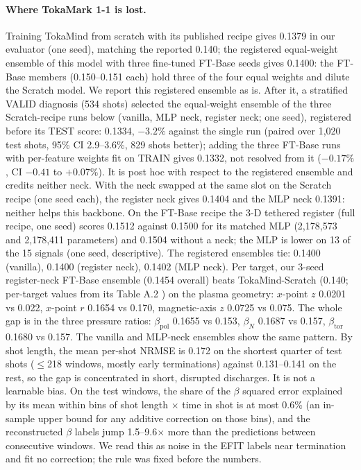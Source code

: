 \documentclass{article}
\begin{document}
\paragraph{Where TokaMark 1-1 is lost.} Training TokaMind from scratch with its published recipe gives 0.1379 in our
evaluator (one seed), matching the reported 0.140; the registered equal-weight ensemble of this model with three
fine-tuned FT-Base seeds gives 0.1400: the FT-Base members (0.150--0.151 each) hold three of the four equal weights and dilute
the Scratch model. We report this registered ensemble as is. After it, a stratified VALID diagnosis (534 shots) selected
the equal-weight ensemble of the three Scratch-recipe runs below (vanilla, MLP neck, register neck; one seed), registered
before its TEST score: 0.1334, $-3.2\%$ against the single run (paired over 1{,}020 test shots, 95\% CI 2.9--3.6\%,
829 shots better); adding the three FT-Base runs with per-feature weights fit on TRAIN gives 0.1332, not resolved from it ($-0.17\%$, CI $-0.41$ to $+0.07\%$). It is post hoc with respect to the registered ensemble and credits neither neck. With the neck swapped
at the same slot on the Scratch recipe (one seed each), the register neck gives 0.1404 and the MLP neck 0.1391: neither
helps this backbone. On the FT-Base recipe the 3-D tethered register (full recipe, one seed) scores 0.1512 against 0.1500
for its matched MLP (2{,}178{,}573 and 2{,}178{,}411 parameters) and 0.1504 without a neck; the MLP is lower on 13 of the 15 signals
(one seed, descriptive). The registered ensembles tie: 0.1400 (vanilla), 0.1400 (register neck), 0.1402 (MLP neck). Per target, our 3-seed register-neck FT-Base ensemble (0.1454 overall) beats
TokaMind-Scratch (0.140; per-target values from its Table A.2 \citep{boschi2026tokamind}) on the plasma geometry:
$x$-point $z$ 0.0201 vs 0.022, $x$-point $r$ 0.1654 vs 0.170, magnetic-axis $z$ 0.0725 vs 0.075. The whole gap is in the
three pressure ratios: $\beta_{\mathrm{pol}}$ 0.1655 vs 0.153, $\beta_N$ 0.1687 vs 0.157, $\beta_{\mathrm{tor}}$ 0.1680
vs 0.157. The vanilla and MLP-neck ensembles show the same pattern. By shot length, the mean per-shot NRMSE is 0.172
on the shortest quarter of test shots ($\le$218 windows, mostly early terminations) against 0.131--0.141 on the rest,
so the gap is concentrated in short, disrupted discharges. It is not a learnable bias. On the test windows, the share of
the $\beta$ squared error explained by its mean within bins of shot length $\times$ time in shot is at most 0.6\% (an
in-sample upper bound for any additive correction on those bins), and the reconstructed $\beta$ labels jump 1.5--9.6$\times$
more than the predictions between consecutive windows. We read this as noise in the EFIT labels near termination and
fit no correction; the rule was fixed before the numbers.
\end{document}
